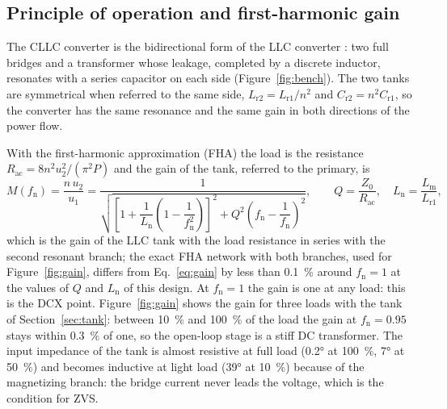 \documentclass[12pt,a4paper]{scrartcl}
\newcommand{\ped}[1]{_{\mathrm{#1}}}
\begin{document}
\begin{onehalfspace}
\subsection{Principle of operation and first-harmonic gain}
\label{sec:principle}

The CLLC converter \cite{jung2013} is the bidirectional form of the LLC converter \cite{yang2002, huang2010}: two full bridges and a transformer whose leakage, completed by a discrete inductor, resonates with a series capacitor on each side (Figure~\ref{fig:bench}). The two tanks are symmetrical when referred to the same side, $L\ped{r2} = L\ped{r1}/n^2$ and $C\ped{r2} = n^2 C\ped{r1}$, so the converter has the same resonance and the same gain in both directions of the power flow.

With the first-harmonic approximation (FHA) \cite{steigerwald1988} the load is the resistance $R\ped{ac} = 8 n^2 u\ped{2}^2/(\pi^2 P)$ and the gain of the tank, referred to the primary, is
\begin{equation}
	M(f\ped{n}) = \frac{n\,u\ped{2}}{u\ped{1}} =
	\frac{1}{\sqrt{\left[1 + \dfrac{1}{L\ped{n}}\left(1 - \dfrac{1}{f\ped{n}^2}\right)\right]^2 + Q^2 \left(f\ped{n} - \dfrac{1}{f\ped{n}}\right)^2}},
	\qquad Q = \frac{Z\ped{0}}{R\ped{ac}},\quad L\ped{n} = \frac{L\ped{m}}{L\ped{r1}},
	\label{eq:gain}
\end{equation}
which is the gain of the LLC tank with the load resistance in series with the second resonant branch; the exact FHA network with both branches, used for Figure~\ref{fig:gain}, differs from Eq.~\eqref{eq:gain} by less than \SI{0.1}{\percent} around $f\ped{n} = 1$ at the values of $Q$ and $L\ped{n}$ of this design. At $f\ped{n} = 1$ the gain is one at any load: this is the DCX point. Figure~\ref{fig:gain} shows the gain for three loads with the tank of Section~\ref{sec:tank}: between \SI{10}{\percent} and \SI{100}{\percent} of the load the gain at $f\ped{n} = 0.95$ stays within \SI{0.3}{\percent} of one, so the open-loop stage is a stiff DC transformer. The input impedance of the tank is almost resistive at full load (\ang{0.2} at \SI{100}{\percent}, \ang{7} at \SI{50}{\percent}) and becomes inductive at light load (\ang{39} at \SI{10}{\percent}) because of the magnetizing branch: the bridge current never leads the voltage, which is the condition for ZVS.


\end{onehalfspace}
\end{document}
